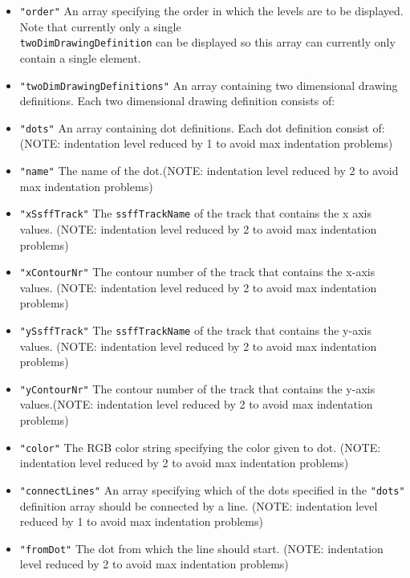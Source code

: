 \documentclass[
]{book}
\begin{document}
\begin{itemize}
\begin{itemize}
\begin{itemize}
      \begin{itemize}
      \item
        \texttt{"order"} An array specifying the order in which the
        levels are to be displayed. Note that currently only a
        single\\
        \texttt{twoDimDrawingDefinition} can be displayed so this array
        can currently only contain a single element.
      \item
        \texttt{"twoDimDrawingDefinitions"} An array containing two
        dimensional drawing definitions. Each two dimensional
        drawing definition consists of:
      \item
        \texttt{"dots"} An array containing dot definitions. Each dot definition consist of: (NOTE: indentation level reduced by 1 to avoid max indentation problems)
      \item
        \texttt{"name"} The name of the dot.(NOTE: indentation level reduced by 2 to avoid max indentation problems)
      \item
        \texttt{"xSsffTrack"} The \texttt{ssffTrackName} of the track that contains the x axis values. (NOTE: indentation level reduced by 2 to avoid max indentation problems)
      \item
        \texttt{"xContourNr"} The contour number of the track that contains the x-axis values. (NOTE: indentation level reduced by 2 to avoid max indentation problems)
      \item
        \texttt{"ySsffTrack"} The \texttt{ssffTrackName} of the track that contains the y-axis values. (NOTE: indentation level reduced by 2 to avoid max indentation problems)
      \item
        \texttt{"yContourNr"} The contour number of the track that contains the y-axis values.(NOTE: indentation level reduced by 2 to avoid max indentation problems)
      \item
        \texttt{"color"} The RGB color string specifying the color given to dot. (NOTE: indentation level reduced by 2 to avoid max indentation problems)
      \item
        \texttt{"connectLines"} An array specifying which of the dots specified in the \texttt{"dots"} definition array should be connected by a line. (NOTE: indentation level reduced by 1 to avoid max indentation problems)
      \item
        \texttt{"fromDot"} The dot from which the line should start. (NOTE: indentation level reduced by 2 to avoid max indentation problems)

\end{itemize}
\end{itemize}
\end{itemize}
\end{itemize}
\end{document}
